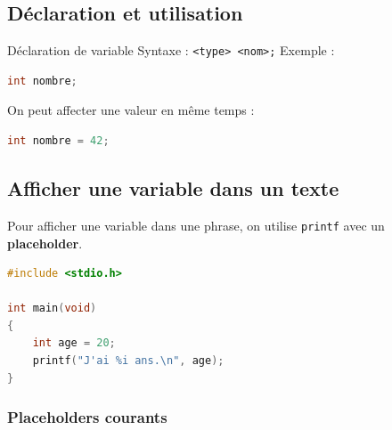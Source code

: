 \subsection{Déclaration et utilisation}

\begin{UPSTIinfor}{Déclaration de variable}
	Syntaxe : \texttt{<type> <nom>;}
	Exemple :
	\begin{lstlisting}[language=c]
int nombre;
\end{lstlisting}
	On peut affecter une valeur en même temps :
	\begin{lstlisting}[language=c]
int nombre = 42;
\end{lstlisting}
\end{UPSTIinfor}

\subsection{Afficher une variable dans un texte}
Pour afficher une variable dans une phrase, on utilise \texttt{printf} avec un \textbf{placeholder}.

\begin{lstlisting}[language=c]
#include <stdio.h>

int main(void)
{
    int age = 20;
    printf("J'ai %i ans.\n", age);
}
\end{lstlisting}


\subsubsection{Placeholders courants}

